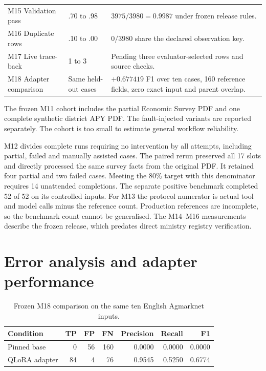 \documentclass[11pt,a4paper]{article}
\begin{document}
\begin{table}[!ht]
\begin{tabularx}{\linewidth}{@{}P{.28\linewidth}P{.17\linewidth}Y@{}}
M15 Validation pass & .70 to .98 & \(3975/3980=0.9987\) under frozen release rules.\\
M16 Duplicate rows & .10 to .00 & \(0/3980\) share the declared observation key.\\
M17 Live trace-back & 1 to 3 & Pending three evaluator-selected rows and source checks.\\
M18 Adapter comparison & Same held-out cases & \(+0.677419\) F1 over ten cases, 160 reference fields, zero exact input and parent overlap.\\
\bottomrule
\end{tabularx}
\end{table}

The frozen M11 cohort includes the partial Economic Survey PDF and one complete synthetic district APY PDF. The fault-injected variants are reported separately. The cohort is too small to estimate general workflow reliability.

M12 divides complete runs requiring no intervention by all attempts, including partial, failed and manually assisted cases. The paired rerun preserved all 17 slots and directly processed the same survey facts from the original PDF. It retained four partial and two failed cases. Meeting the 80\% target with this denominator requires 14 unattended completions. The separate positive benchmark completed 52 of 52 on its controlled inputs. For M13 the protocol numerator is actual tool and model calls minus the reference count. Production references are incomplete, so the benchmark count cannot be generalised. The M14--M16 measurements describe the frozen release, which predates direct ministry registry verification.

\clearpage
\section{Error analysis and adapter performance}
\begin{table}[!ht]
\small
\caption{Frozen M18 comparison on the same ten English Agmarknet inputs.}
\label{tab:adapter}
\begin{tabularx}{\linewidth}{@{}Yrrrrrr@{}}
\toprule
Condition & TP & FP & FN & Precision & Recall & F1\\ \midrule
Pinned base & 0 & 56 & 160 & 0.0000 & 0.0000 & 0.0000\\
QLoRA adapter & 84 & 4 & 76 & 0.9545 & 0.5250 & 0.6774\\
\bottomrule
\end{tabularx}
\end{table}
\end{document}
